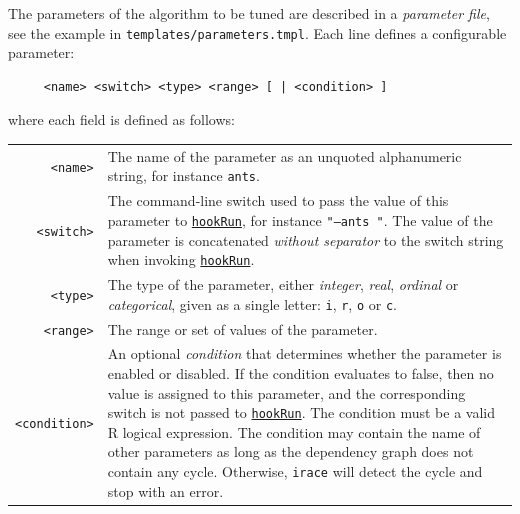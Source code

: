 \documentclass[a4paper]{article}
\newcommand{\irace}{\texttt{irace}\xspace}
\newcommand{\aR}{\textsf{R}\xspace}
\newcommand{\parameter}[1]{\hyperlink{opt:#1}{\texttt{#1}}}
\begin{document}
The parameters of the algorithm to be tuned are described in a
\emph{parameter file}, see the example in \verb|templates/parameters.tmpl|. Each line defines a configurable parameter:
%
\begin{verbatim}
     <name> <switch> <type> <range> [ | <condition> ]
\end{verbatim}
%
where each field is defined as follows:
%
\begin{center}
\renewcommand{\arraystretch}{1.2}
  \begin{tabularx}{0.98\linewidth}{@{}rX}
    \texttt{<name>} & The name of the parameter as an unquoted
    alphanumeric string,
    for instance \texttt{ants}.\\
    \texttt{<switch>}& The command-line switch used to pass the value of this parameter to \parameter{hookRun}, for instance \texttt{"--ants "}. The value of the parameter is concatenated \emph{without separator} to the switch string when invoking \parameter{hookRun}.\\

    \texttt{{<type>}} &The type of the parameter, either
    \textit{integer},
    \textit{real}, \textit{ordinal} or \textit{categorical}, given as a single letter: \texttt{i}, \texttt{r}, \texttt{o} or \texttt{c}. \\
    \texttt{{<range>}} &The range or set of values of the parameter.\\
    \texttt{{<condition>}}& An optional \emph{condition} that
    determines whether the parameter is enabled or disabled. If the
    condition evaluates to false, then no value is assigned to this
    parameter, and the corresponding switch is not passed
    to \parameter{hookRun}. The condition must be a valid \aR logical
    expression. The condition may contain the name of other parameters
    as long as the dependency graph does not contain any
    cycle. Otherwise, \irace will detect the cycle and stop with an error.\\
  \end{tabularx}
\end{center}
\end{document}
